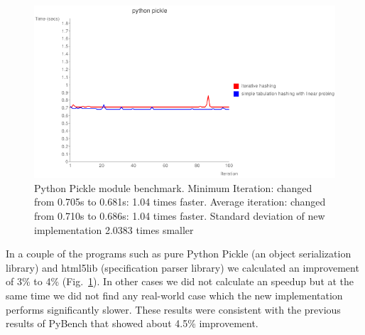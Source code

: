 \documentclass[runningheads,a4paper]{llncs}
\begin{document}
\begin{figure}[!ht]
  \centering
  \includegraphics[width=12cm]{slowpickle.png}
  \caption{Python Pickle module benchmark. Minimum Iteration: changed from 0.705s to 0.681s: 1.04 times faster. Average iteration: changed from 0.710s to 0.686s: 1.04 times faster. Standard deviation of new implementation 2.0383 times smaller}
  \label{fig:pickle}
\end{figure}


In a couple of the programs such as pure Python Pickle (an object serialization
library) and html5lib (specification parser library) we calculated an
improvement of 3\% to 4\% (Fig.~\ref{fig:pickle}). In other cases we did not calculate an speedup but
at the same time we did not find any real-world case which the new
implementation performs significantly slower. These results were consistent
with the previous results of PyBench that showed about 4.5\% improvement.
 
\end{document}
